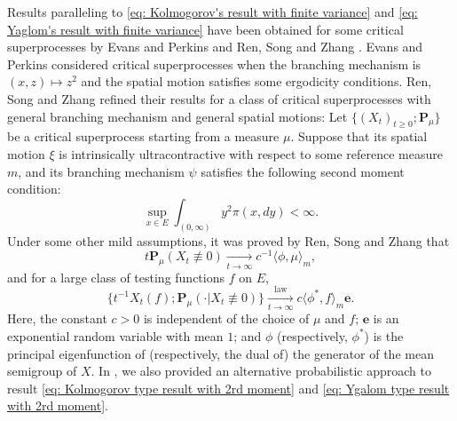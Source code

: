 \documentclass[12pt, a4paper]{amsart}
\theoremstyle{definition}
\numberwithin{equation}{section}
\begin{document}
	Results paralleling to \eqref{eq: Kolmogorov's result with finite variance} and \eqref{eq: Yaglom's result with finite variance} have been obtained for some critical superprocesses by Evans and Perkins \cite{EvansPerkins1990Measure-valued} and Ren, Song and Zhang \cite{RenSongZhang2015Limit}. 
	Evans and Perkins \cite{EvansPerkins1990Measure-valued} considered critical superprocesses when  the branching mechanism is $(x,z)\mapsto z^2$ and the spatial motion satisfies some ergodicity conditions.
	Ren, Song and Zhang \cite{RenSongZhang2015Limit} refined their results for a class of critical superprocesses with general branching mechanism and general spatial motions: 
	Let $\{(X_t)_{t\geq 0}; \mathbf P_\mu \}$ be a critical superprocess starting from a measure $\mu$. 
	Suppose that its spatial motion $\xi$ is intrinsically ultracontractive with respect to some reference measure $m$, and its branching mechanism $\psi$ satisfies the following second moment condition:
\[\label{eq: second moment condition}
	\sup_{x\in E} \int_{(0,\infty)} y^2 \pi(x,dy)
	< \infty.
\]
	Under some other mild assumptions, it was proved by Ren, Song and Zhang \cite{RenSongZhang2015Limit} that
\[\label{eq: Kolmogorov type result with 2rd moment}
	t \mathbf P_\mu(X_t \not \equiv 0) 
	\xrightarrow[t\to \infty]{} c^{-1} \langle \phi, \mu \rangle_m,
\]
	and for a large class of testing functions $f$ on $E$,
\[\label{eq: Ygalom type result with 2rd moment}
	\{ t^{-1}X_t(f); \mathbf P_\mu (\cdot | X_t \not\equiv 0)\} 
	\xrightarrow[t\to \infty]{\operatorname{law}} c \langle \phi^*, f\rangle_m \mathbf e.
\]
	Here, the constant $c > 0$ is independent of the choice of $\mu$ and $f$; 
	$\mathbf e$ is an exponential random variable with mean $1$; 
	and $\phi$ (respectively, $\phi^*$) is the principal eigenfunction of (respectively, the dual of) the generator of the mean semigroup of $X$. 
	In \cite{RenSongSun2017Spine}, we also provided an alternative probabilistic approach to result \eqref{eq: Kolmogorov type result with 2rd moment} and \eqref{eq: Ygalom type result with 2rd moment}.
	
\end{document}

